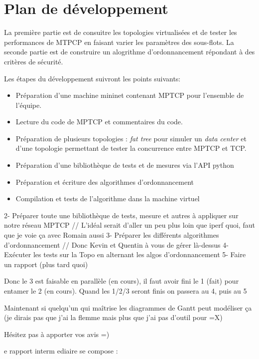 \section{Plan de développement}
\label{sec:plan:devt}

La première partie est de consuitre les topologies virtualisées et de
tester les performances de MTPCP en faisant varier les paramètres des
sous-flots. La seconde partie est de construire un alogrithme
d'ordonnancement répondant à des critères de sécurité.

Les étapes du développement suivront les points suivants:

\begin{itemize}
\item Préparation d'une machine mininet contenant MPTCP pour
  l'ensemble de l'équipe.
\item Lecture du code de MPTCP et commentaires du code.
\item Préparation de plusieurs topologies : \emph{fat tree} pour
  simuler un \emph{data center} et d'une topologie permettant de
  tester la concurrence entre MPTCP et TCP.
\item Préparation d'une bibliothèque de tests et de mesures via l'API python
\item Préparation et écriture des algorithmes d'ordonnancement
\item Compilation et tests de l'algorithme dans la machine virtuel
\end{itemize}

 





2- Préparer toute une bibliothèque de tests, mesure et autres à appliquer sur notre réseau MPTCP
// L'idéal serait d'aller un peu plus loin que iperf quoi, faut que je voie ça avec Romain aussi
3- Préparer les différents algorithmes d'ordonnancement
// Donc Kevin et Quentin à vous de gérer là-dessus
4- Exécuter les tests sur la Topo en alternant les algos d'ordonnancement
5- Faire un rapport (plus tard quoi)

Donc le 3 est faisable en parallèle (en cours), il faut avoir fini le 1 (fait) pour entamer le 2 (en cours).
Quand les 1/2/3 seront finis on passera au 4, puis au 5

Maintenant si quelqu'un qui maîtrise les diagrammes de Gantt peut modéliser ça (je dirais pas que j'ai la flemme mais plus que j'ai pas d'outil pour =X)

Hésitez pas à apporter vos avis =)


e rapport interm ediaire se compose :

